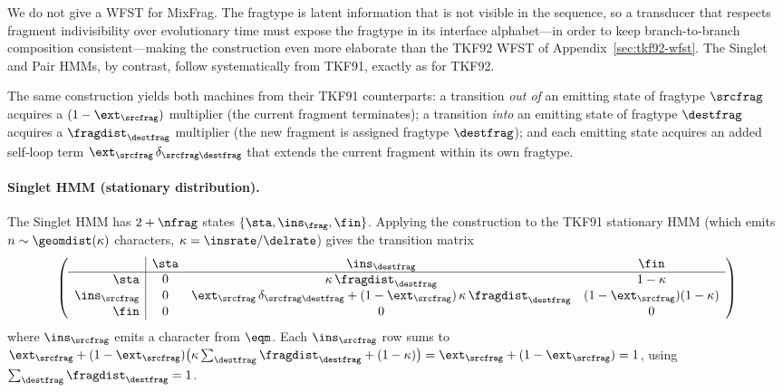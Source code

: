We do not give a WFST for MixFrag.
The fragtype is latent information that is not visible in the sequence, so a
transducer that respects fragment indivisibility over evolutionary time must
expose the fragtype in its interface alphabet---in order to keep
branch-to-branch composition consistent---making the construction even more
elaborate than the TKF92 WFST of Appendix~\ref{sec:tkf92-wfst}.
The Singlet and Pair HMMs, by contrast, follow systematically from TKF91,
exactly as for TKF92.

The same construction yields both machines from their TKF91 counterparts: a
transition \emph{out of} an emitting state of fragtype $\srcfrag$ acquires a
$(1-\ext_\srcfrag)$ multiplier (the current fragment terminates); a transition
\emph{into} an emitting state of fragtype $\destfrag$ acquires a
$\fragdist_\destfrag$ multiplier (the new fragment is assigned fragtype
$\destfrag$); and each emitting state acquires an added self-loop term
$\ext_\srcfrag\,\delta_{\srcfrag\destfrag}$ that extends the current fragment
within its own fragtype.

\paragraph{Singlet HMM (stationary distribution).}
The Singlet HMM has $2+\nfrag$ states $\{\sta,\ins_\frag,\fin\}$.
Applying the construction to the TKF91 stationary HMM (which emits
$n \sim \geomdist(\kappa)$ characters, $\kappa = \insrate/\delrate$) gives the
transition matrix
\[
\left(
\begin{array}{r|ccc}
& \sta & \ins_\destfrag & \fin \\
\hline
\sta          & 0 & \kappa\,\fragdist_\destfrag & 1-\kappa \\
\ins_\srcfrag & 0 & \ext_\srcfrag\,\delta_{\srcfrag\destfrag}
                    + (1-\ext_\srcfrag)\,\kappa\,\fragdist_\destfrag
                  & (1-\ext_\srcfrag)(1-\kappa) \\
\fin          & 0 & 0 & 0
\end{array}
\right)
\]
where $\ins_\srcfrag$ emits a character from $\eqm$.
Each $\ins_\srcfrag$ row sums to
$\ext_\srcfrag + (1-\ext_\srcfrag)\big(\kappa\sum_\destfrag\fragdist_\destfrag
+ (1-\kappa)\big) = \ext_\srcfrag + (1-\ext_\srcfrag) = 1$,
using $\sum_\destfrag\fragdist_\destfrag = 1$.

